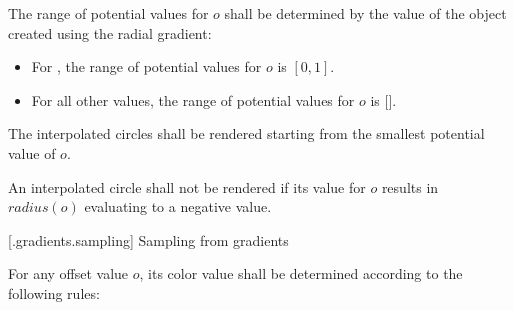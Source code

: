 \pnum
The range of potential values for $o$ shall be determined by the  value of the  object created using the radial gradient:
\begin{itemize}
\item For , the range of potential values for $o$ is $[0,1]$.
\item For all other  values, the range of potential values for $o$ is $[$$]$.
\end{itemize}

\pnum
The interpolated circles shall be rendered starting from the smallest potential value of $o$.

\pnum
An interpolated circle shall not be rendered if its value for $o$ results in $radius(o)$ evaluating to a negative value.

 [\iotwod.gradients.sampling] {Sampling from gradients}

\pnum
For any offset value $o$, its color value shall be determined according to the following rules:

